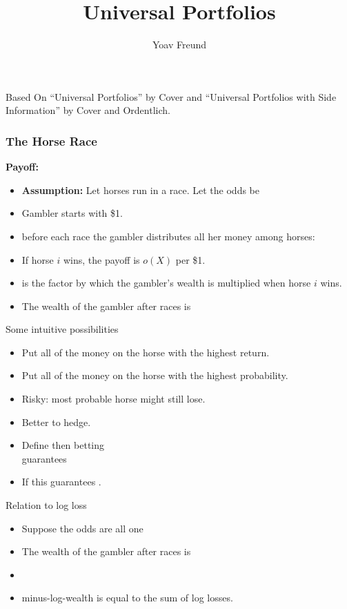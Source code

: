 \documentclass{beamer}
\title [Universal Portfolios] %
{Universal Portfolios}
\author[Freund] %
{Yoav Freund}
\institute[Universities of Somewhere and Elsewhere] %
\begin{document}
\begin{small}
%

\begin{frame}
  \titlepage
  Based On ``Universal Portfolios'' by Cover and ``Universal Portfolios with Side Information'' by Cover and Ordentlich.
\end{frame}

\begin{frame}[t]
  \frametitle{The Horse Race}
  \textbf{Payoff:} 
  \begin{itemize}
  \item \textbf{Assumption:} Let  horses run in a race. Let the odds be 
  \item Gambler starts with \$1.
  \item before each race the gambler distributes all her money among   horses:  
  \item If horse \(i\) wins, the payoff is \(o(X)\) per \$1.
  \item {} is the factor by which the gambler's wealth 
    is multiplied when horse \(i\) wins.
  \item The wealth of the gambler after  races is
    \R{\[
        S_n = \prod_{j=1}^n o(i_j)b(i_j),
      \]}
  \end{itemize}
\end{frame}

\begin{frame}{Some intuitive possibilities}
  \begin{itemize}
  \item Put all of the money on the horse with the highest return.
  \item Put all of the money on the horse with the highest probability.
  \item Risky: most probable horse might still lose.
  \item Better to hedge.
  \item Define  then betting
    \\
    guarantees 
  \item If  this guarantees .
  \end{itemize}


\end{frame}
\begin{frame}{Relation to log loss}
  \begin{itemize}
  \item Suppose the odds are all one 
  \item The wealth of the gambler after  races is
    \R{\[
        S_n = \prod_{i=1}^n b_i,
      \]}
  \item {}
    \item minus-log-wealth is equal to the sum of log losses.
  \end{itemize}
\end{frame}


\end{small}
\end{document}
